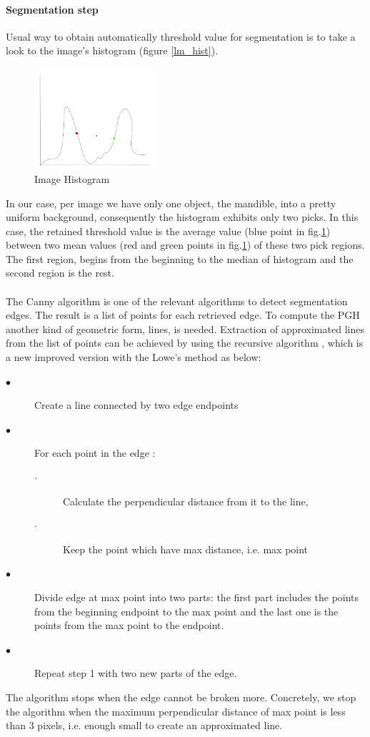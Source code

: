 \documentclass[twoside,twocolumn,10pt]{article}
\begin{document}
\paragraph{Segmentation step}
Usual way to obtain automatically threshold value for 
segmentation is to take a look to the image's histogram (figure
\ref{lm_hist}). 
\begin{figure}
\centering
\includegraphics[width=4.5cm]{./images/hist}
\caption{\small{Image Histogram}}
\label{lm_hist1}
\end{figure}
In our case, per image we have only one object, the mandible,  into a
pretty uniform background, consequently the histogram exhibits only two
picks. In this case, the retained threshold value is the average 
value (blue point in fig.\ref{lm_hist1}) between two mean values (red and
green points in fig.\ref{lm_hist1}) of these two pick regions. The first region,
begins from the beginning to the median of histogram and the second region is the rest.\\
\\
The Canny algorithm \cite{canny1986computational} is one of the
relevant algorithms to detect segmentation edges. The result is a list
of points for each retrieved edge. To compute the PGH another kind of
geometric form, lines, is needed. Extraction of approximated lines
from the list of points can be achieved by using the
recursive algorithm \cite{thacker1995assessing}, which is a new improved version with the Lowe's method\cite{lowe1987three} as below:
{\small{\begin{description}
    \item[$\bullet$] Create a line connected by two edge endpoints
    \item[$\bullet$] For each point in the edge :
      \begin{description}
    		  \item[$\cdot$] Calculate the perpendicular distance from it to the line,
      	  \item[$\cdot$] Keep the point which have max distance, i.e. max point
 	 \end{description}
	  \item[$\bullet$] Divide edge at max point into two parts: the first part includes the points from the beginning endpoint to the max point and the last one is the points from the max point to  the endpoint.
      \item[$\bullet$] Repeat step 1 with two new parts of the edge.
  \end{description}
 } }
The algorithm stops when the edge cannot be broken more. Concretely,
we stop the algorithm when the maximum perpendicular distance of max
point is less than $3$ pixels, i.e. enough small to create an approximated line.
\end{document}
